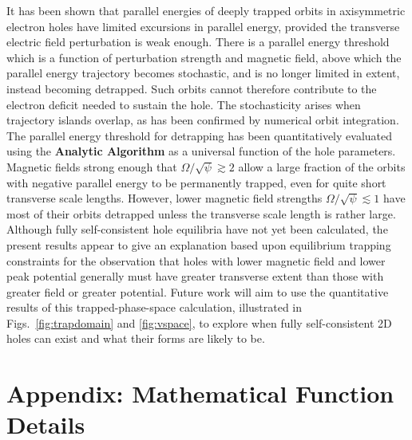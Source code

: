 \documentclass{agujournal2019}
\begin{document}
It has been shown that parallel energies of deeply trapped orbits in
axisymmetric electron holes have limited excursions in parallel
energy, provided the transverse electric field perturbation is weak
enough. There is a parallel energy threshold which is a function of
perturbation strength and magnetic field, above which the parallel
energy trajectory becomes stochastic, and is no longer limited in
extent, instead becoming detrapped. Such orbits cannot therefore
contribute to the electron deficit needed to sustain the hole. The
stochasticity arises when trajectory islands overlap, as has been
confirmed by numerical orbit integration. The parallel energy
threshold for detrapping has been quantitatively evaluated using the
\textbf{Analytic Algorithm} as a universal function of the hole
parameters. Magnetic fields strong enough that
$\Omega/\sqrt\psi\gtrsim 2$ allow a large fraction of the orbits with
negative parallel energy to be permanently trapped, even for quite
short transverse scale lengths. However, lower magnetic field
strengths $\Omega/\sqrt\psi\lesssim 1$ have most of their orbits
detrapped unless the transverse scale length is rather large. Although
fully self-consistent hole equilibria have not yet been calculated,
the present results appear to give an explanation based upon
equilibrium trapping constraints for the observation that holes with
lower magnetic field and lower peak potential generally must have
greater transverse extent than those with greater field or greater
potential. Future work will aim to use the quantitative results of
this trapped-phase-space calculation, illustrated in Figs.\
\ref{fig:trapdomain} and \ref{fig:vspace}, to explore when fully
self-consistent 2D holes can exist and what their forms are likely to
be.

\section*{Appendix: Mathematical Function Details}
\end{document}
